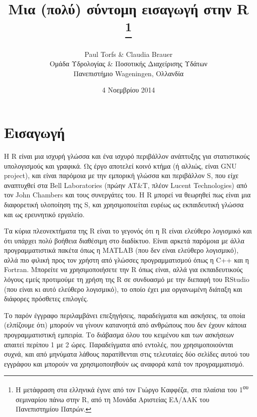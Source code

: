 \documentclass[a4paper,10pt,twocolumn]{article}
\title{\vspace{-13mm} \textbf{Μια (πολύ) σύντομη εισαγωγή στην R}
\footnote{Η μετάφραση στα ελληνικά έγινε από τον Γιώργο Καφφέζα, στα πλαίσια του 1\textsuperscript{ου}
σεμιναρίου πάνω στην R, από τη Μονάδα Αριστείας ΕΛ/ΛΑΚ του Πανεπιστημίου Πατρών.}}
\author{Paul Torfs \& Claudia Brauer\\
\small{Ομάδα Υδρολογίας \& Ποσοτικής Διαχείρισης Υδάτων}\\
\small{Πανεπιστήμιο Wageningen, Ολλανδία}}
\date{\small{4 Νοεμβρίου 2014}}
\begin{document}
\maketitle


\section{Εισαγωγή}

Η R είναι μια ισχυρή γλώσσα και ένα ισχυρό περιβάλλον ανάπτυξης για στατιστικούς
υπολογισμούς και γραφικά. Ως έργο αποτελεί κοινό κτήμα (ή αλλιώς, είναι GNU project),
και είναι παρόμοια με την εμπορική γλώσσα και περιβάλλον S, που είχε αναπτυχθεί στα Bell 
Laboratories (πρώην AT\&T, πλέον Lucent Technologies) από τον John Chambers και τους συνεργάτες
του. Η R μπορεί να θεωρηθεί πως είναι μια διαφορετική υλοποίηση της S, και χρησιμοποιείται ευρέως
ως εκπαιδευτική γλώσσα και ως ερευνητικό εργαλείο.

Τα κύρια πλεονεκτήματα της R είναι το γεγονός ότι η R είναι ελεύθερο λογισμικό και ότι υπάρχει
πολύ βοήθεια διαθέσιμη στο διαδίκτυο. Είναι αρκετά παρόμοια με άλλα προγραμματιστικά πακέτα όπως 
η MATLAB (που δεν είναι ελεύθερο λογισμικό), αλλά πιο φιλική προς τον χρήστη από γλώσσες
προγραμματισμού όπως η C++ και η Fortran. Μπορείτε να χρησιμοποιήσετε την R όπως είναι, αλλά για
εκπαιδευτικούς λόγους εμείς προτιμούμε τη χρήση της R σε συνδυασμό με την διεπαφή του RStudio
(που είναι κι αυτό ελεύθερο λογισμικό), το οποίο έχει μια οργανωμένη διάταξη και διάφορες πρόσθετες
επιλογές.

Το παρόν έγγραφο περιλαμβάνει επεξηγήσεις, παραδείγματα και ασκήσεις, τα οποία (ελπίζουμε ότι)
μπορούν να γίνουν κατανοητά από ανθρώπους που δεν έχουν κάποια προγραμματιστική εμπειρία. Το διάβασμα
όλου του κειμένου και των ασκήσεων απαιτεί περίπου 1 με 2 ώρες. Παραδείγματα από εντολές, που 
χρησιμοποιούνται συχνά, και από μηνύματα λάθους παρατίθενται στις τελευταίες δύο σελίδες αυτού
του εγγράφου και μπορούν να χρησιμοποιηθούν ως αναφορά κατά τον προγραμματισμό.


\end{document}

